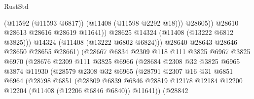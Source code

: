 \begin{lexlean}{RustStd}
\begin{coremodule}
                                          (@11592 (@11593 @6817))
                                          (@11408 (@11598 @2292 @18)))
                                        @28605))
                                    @28610
                                    @28613
                                    @28616
                                    @28619
                                    @11641))
                                @28625
                                @14324
                                (@11408 (@13222 @6812 @3825)))
                              @14324
                              (@11408 (@13222 @6802 @6824)))
                            @28640
                            @28643
                            @28646
                            @28650
                            @28655
                            @28661)
                          (@28667
                            @6834
                            @2309
                            @118
                            @111
                            @3825
                            @6967
                            @3825
                            @6970
                            (@28676
                              @2309
                              @111
                              @3825
                              @6966
                              (@28684
                                @2308
                                @32
                                @3825
                                @6965
                                @3874
                                @11930
                                (@28579
                                  @2308
                                  @32
                                  @6965
                                  (@28791
                                    @2307
                                    @16
                                    @31
                                    @6851
                                    @6964
                                    (@28798
                                      @6851
                                      (@28809
                                        @6839
                                        @6846
                                        @28819
                                        @12178
                                        @12184
                                        @12200
                                        @12204
                                        (@11408 (@12206 @6846 @6840))
                                        @11641))
                                    (@28842

\end{coremodule}
\end{lexlean}
